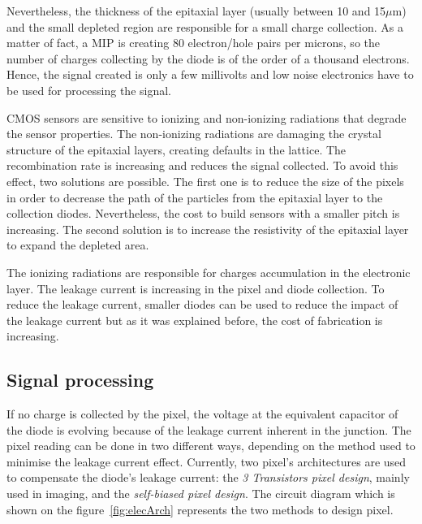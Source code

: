     Nevertheless, the thickness of the epitaxial layer (usually between 10 and 15$\mu$m) and the small depleted region are responsible for a small charge collection.
    As a matter of fact, a \gls{MIP} is creating 80 electron/hole pairs per microns, so the number of charges collecting by the diode is of the order of a thousand electrons.
    Hence, the signal created is only a few millivolts and low noise electronics have to be used for processing the signal.

    CMOS sensors are sensitive to ionizing and non-ionizing radiations that degrade the sensor properties.
    The non-ionizing radiations are damaging the crystal structure of the epitaxial layers, creating defaults in the lattice.
    The recombination rate is increasing and reduces the signal collected.
    To avoid this effect, two solutions are possible.
    The first one is to reduce the size of the pixels in order to decrease the path of the particles from the epitaxial layer to the collection diodes.
    Nevertheless, the cost to build sensors with a smaller pitch is increasing.
    The second solution is to increase the resistivity of the epitaxial layer to expand the depleted area.
    
    The ionizing radiations are responsible for charges accumulation in the electronic layer.
    The leakage current is increasing in the pixel and diode collection.
    To reduce the leakage current, smaller diodes can be used to reduce the impact of the leakage current but as it was explained before, the cost of fabrication is increasing.
    
    \subsection{Signal processing}

    If no charge is collected by the pixel, the voltage at the equivalent capacitor of the diode is evolving because of the leakage current inherent in the junction.
    The pixel reading can be done in two different ways, depending on the method used to minimise the leakage current effect.
    Currently, two pixel's architectures are used to compensate the diode's leakage current: the \textit{3 Transistors pixel design}, mainly used in imaging, and the \textit{self-biased pixel design}.
    The circuit diagram which is shown on the figure~\ref{fig:elecArch} represents the two methods to design pixel.

